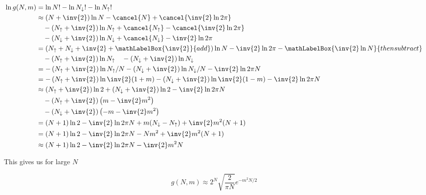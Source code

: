 {\begin{equation}\label{eqn:basicStatMechProblemSet3Problem3:220}
\begin{aligned}
\ln g(N, m) 
&= \ln N! - \ln N_{\downarrow}! - \ln N_{\uparrow}! \\
&\approx 
\left( N + \inv{2} \right) \ln N - \cancel{N} + \cancel{ \inv{2} \ln 2 \pi }  \\
&\quad-\left( N_{\uparrow} + \inv{2} \right) \ln N_{\uparrow} + \cancel{N_{\uparrow}} - \cancel{\inv{2} \ln 2 \pi}  \\
&\quad-\left( N_{\downarrow} + \inv{2} \right) \ln N_{\downarrow} + \cancel{N_{\downarrow}} - \inv{2} \ln 2 \pi \\
&=
\left( N_{\uparrow} + N_{\downarrow} + \inv{2} + \mathLabelBox{\inv{2}}{add} \right) \ln N  
-\inv{2} \ln 2 \pi 
- 
\mathLabelBox{
\inv{2} \ln N
}{then subtract}  \\
&\quad -\left( N_{\uparrow} + \inv{2} \right) \ln N_{\uparrow}  
\quad -\left( N_{\downarrow} + \inv{2} \right) \ln N_{\downarrow}   
\\
&=
-\left( N_{\uparrow} + \inv{2} \right) \ln N_{\uparrow}/N
-\left( N_{\downarrow} + \inv{2} \right) \ln N_{\downarrow}/N
- \inv{2} \ln 2 \pi N \\
&=
-\left( N_{\uparrow} + \inv{2} \right) \ln \inv{2}( 1 + m )
-\left( N_{\downarrow} + \inv{2} \right) \ln \inv{2} ( 1 - m )
- \inv{2} \ln 2 \pi N \\
&\approx
\left( N_{\uparrow} + \inv{2} \right) \ln 2
+\left( N_{\downarrow} + \inv{2} \right) \ln 2 
- \inv{2} \ln 2 \pi N \\
&\quad -\left( N_{\uparrow} + \inv{2} \right) \left(m - \inv{2} m^2 \right) \\
&\quad -\left( N_{\downarrow} + \inv{2} \right) \left( -m - \inv{2} m^2 \right) \\
&= 
(N + 1) \ln 2 - \inv{2} \ln 2 \pi N
+ m ( N_{\downarrow} - N_{\uparrow} )
+ \inv{2} m^2 ( N + 1 ) \\
&= 
(N + 1) \ln 2 - \inv{2} \ln 2 \pi N
- N m^2
+ \inv{2} m^2 ( N + 1 ) \\
&\approx
(N + 1) \ln 2 - \inv{2} \ln 2 \pi N
- \inv{2} m^2 N
\end{aligned}
\end{equation}

This gives us for large $N$ 

\begin{equation}\label{eqn:basicStatMechProblemSet3Problem3:240}
g(N, m) \approx 2^N \sqrt{\frac{2}{ \pi N}} e^{ -m^2 N/2 }
\end{equation}

}
